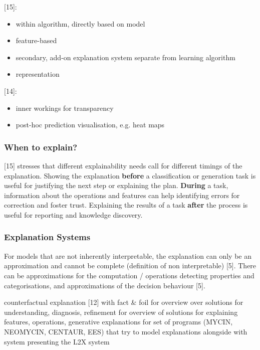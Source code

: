 [15]:
\begin{itemize}
	\item within algorithm, directly based on model
	\item feature-based
	\item secondary, add-on explanation system separate from learning algorithm
	\item representation
\end{itemize}
[14]:
\begin{itemize}
	\item inner workings for transparency
	\item post-hoc prediction visualisation, e.g. heat maps
\end{itemize}



\subsubsection{When to explain?}
[15] stresses that different explainability needs call for different timings of the explanation. Showing the explanation \textbf{before} a classification or generation task is useful for justifying the next step or explaining the plan. {\color{green}\textbf{During} a task, information about the operations and features can help identifying errors for correction and foster trust.} Explaining the results of a task \textbf{after} the process is useful for reporting and knowledge discovery.



\subsubsection{Explanation Systems}
For models that are not inherently interpretable, the explanation can only be an approximation and cannot be complete (definition of non interpretable) [5]. There can be approximations for the computation / operations detecting properties and categorisations, and approximations of the decision behaviour [5].\newline

counterfactual explanation [12] with fact \& foil \newline
[4] for overview over solutions for understanding, diagnosis, refinement \newline
[6] for overview of solutions for explaining features, operations, generative explanations \newline
[14] for set of programs (MYCIN, NEOMYCIN, CENTAUR, EES) that try to model explanations alongside with system \newline
[19] presenting the L2X system\newline

